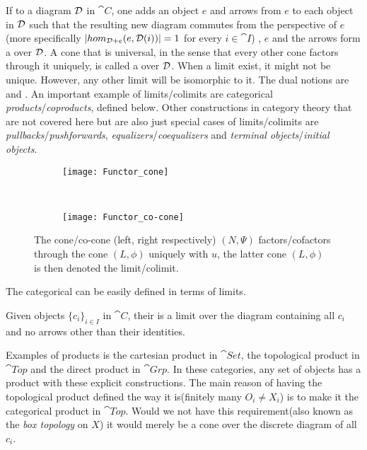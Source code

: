\documentclass[../../main.tex]{subfiles}
\begin{document}
    If to a diagram $\mathcal{D}$ in $\cat{C}$, one adds an object $e$ and arrows from $e$ to each object in $\mathcal{D}$ such that the resulting new diagram commutes from the perspective of $e$(more specifically $|hom_{\mathcal{D}+e}(e, \mathcal{D}(i))| = 1$ for every $i \in \cat{I}$) , $e$ and the arrows form a  over $\mathcal{D}$. A cone that is universal, in the sense that every other cone factors through it uniquely, is called a  over $\mathcal{D}$. When a limit exist, it might not be unique. However, any other limit will be isomorphic to it. The dual notions are  and . An important example of limits/colimits are categorical \emph{products}/\emph{coproducts}, defined below. Other constructions in category theory that are not covered here but are also just special cases of limits/colimits are \emph{pullbacks}/\emph{pushforwards}, \emph{equalizers}/\emph{coequalizers} and \emph{terminal objects}/\emph{initial objects}.
    
    \begin{figure}[H]
        \centering
        \begin{subfigure}[b]{0.5\textwidth}
            \centering
            \texttt{[image: Functor\_cone]}
            \caption{}
        \end{subfigure}%
        ~ 
        \begin{subfigure}[b]{0.5\textwidth}
            \centering
            \texttt{[image: Functor\_co-cone]}
            \caption{}
        \end{subfigure}
        \caption{The cone/co-cone (left, right respectively) $(N,\Psi)$ factors/cofactors through the cone $(L,\phi)$ uniquely with $u$, the latter cone $(L,\phi)$ is then denoted the limit/colimit.}
    \end{figure}
    
    The categorical  can be easily defined in terms of limits. 
    
    \begin{definition}
        Given objects $\{c_i\}_{i \in I}$ in $\cat{C}$, their  is a limit over the diagram containing all $c_i$ and no arrows other than their identities.
    \end{definition}
    
    Examples of products is the cartesian product in $\cat{Set}$, the topological product in $\cat{Top}$ and the direct product in $\cat{Grp}$. In these categories, any set of objects has a product with these explicit constructions. The main reason of having the topological product defined the way it is(finitely many $O_i \neq X_i$) is to make it the categorical product in $\cat{Top}$. Would we not have this requirement(also known as the \emph{box topology} on $X$) it would merely be a cone over the discrete diagram of all $c_i$.
    
\end{document}
